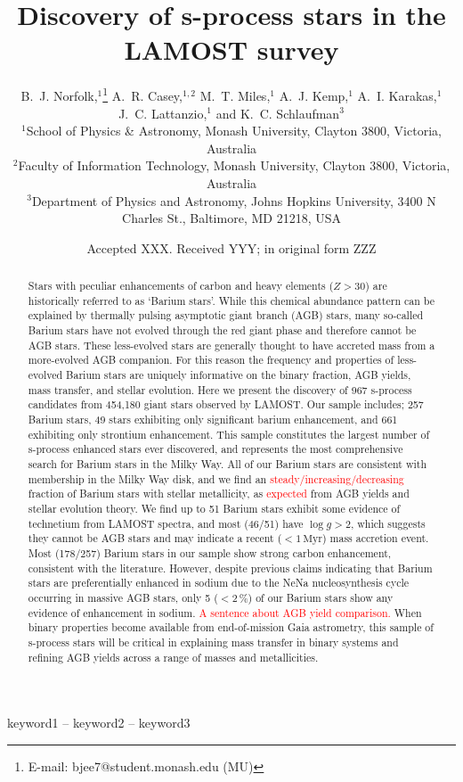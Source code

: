 \documentclass[a4paper,fleqn,usenatbib]{mnras}
\title[S-process stars in LAMOST]{Discovery of s-process stars in the LAMOST survey}
\author[B.~J. Norfolk et al.]{B.~J. Norfolk,$^{1}$\thanks{E-mail: bjee7@student.monash.edu (MU)}
A.~R. Casey,$^{1,2}$
M.~T. Miles,$^{1}$
A.~J. Kemp,$^{1}$ 
A.~I. Karakas,$^{1}$ \newauthor
J.~C. Lattanzio,$^{1}$
and K.~C. Schlaufman$^{3}$
\\
$^{1}$School of Physics \& Astronomy, Monash University, Clayton 3800, Victoria, Australia\\
$^{2}$Faculty of Information Technology, Monash University, Clayton 3800, Victoria, Australia\\
$^{3}$Department of Physics and Astronomy, Johns Hopkins University, 3400 N Charles St., Baltimore, MD 21218, USA
}
\date{Accepted XXX. Received YYY; in original form ZZZ}
\newcommand{\todo}[1]{\textcolor{red}{#1}}
\begin{document}
\label{firstpage}
\pagerange{\pageref{firstpage}--\pageref{lastpage}}
\maketitle

\begin{abstract}
Stars with peculiar enhancements of carbon and heavy elements ($Z > 30$) are historically referred to as `Barium stars'. While this chemical abundance pattern can be explained by thermally pulsing asymptotic giant branch (AGB) stars, many so-called Barium stars have not evolved through the red giant phase and therefore cannot be AGB stars. These less-evolved stars are generally thought to have accreted mass from a more-evolved AGB companion. For this reason the frequency and properties of less-evolved Barium stars are uniquely informative on the binary fraction, AGB yields, mass transfer, and stellar evolution. Here we present the discovery of 967 s-process candidates from 454,180 giant stars observed by LAMOST. Our sample includes; 257 Barium stars, 49 stars exhibiting only significant barium enhancement, and 661 exhibiting only strontium enhancement. This sample constitutes the largest number of s-process enhanced stars ever discovered, and represents the most comprehensive search for Barium stars in the Milky Way. All of our Barium stars are consistent with membership in the Milky Way disk, and we find an \todo{steady/increasing/decreasing} fraction of Barium stars with stellar metallicity, as \todo{expected} from AGB yields and stellar evolution theory. We find up to 51 Barium stars exhibit some evidence of technetium from LAMOST spectra, and most (46/51) have $\log{g} > 2$, which suggests they cannot be AGB stars and may indicate a recent ($<1\,\textrm{Myr}$) mass accretion event. Most (178/257) Barium stars in our sample show strong carbon enhancement, consistent with the literature. However, despite previous claims indicating that Barium stars are preferentially enhanced in sodium due to the NeNa nucleosynthesis cycle occurring in massive AGB stars, only 5 ($<2$\,\%) of our Barium stars show any evidence of enhancement in sodium. \todo{A sentence about AGB yield comparison.} When binary properties become available from end-of-mission Gaia astrometry, this sample of s-process stars will be critical in explaining mass transfer in binary systems and refining AGB yields across a range of masses and metallicities.
\end{abstract}

\begin{keywords}
keyword1 -- keyword2 -- keyword3
\end{keywords}
\end{document}
